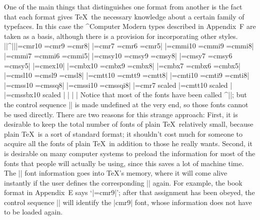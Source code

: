 {{One of the main things that distinguishes one format from another
is the fact that each format gives \TeX\ the necessary knowledge about
a certain family of typefaces. In this case the ^{Computer Modern} types
described in Appendix~F are taken as a basis, although there is a provision
for incorporating other styles.
\beginlines
|\font|^|\tenrm||=cmr10        \font\preloaded=cmr9     \font\preloaded=cmr8|
\nobreak
|\font\sevenrm=cmr7       \font\preloaded=cmr6     \font\fiverm=cmr5|
\smallskip
|\font\teni=cmmi10        \font\preloaded=cmmi9    \font\preloaded=cmmi8|
\nobreak
|\font\seveni=cmmi7       \font\preloaded=cmmi6    \font\fivei=cmmi5|
\smallbreak
|\font\tensy=cmsy10       \font\preloaded=cmsy9    \font\preloaded=cmsy8|
\nobreak
|\font\sevensy=cmsy7      \font\preloaded=cmsy6    \font\fivesy=cmsy5|
\nobreak\smallskip
|\font\tenex=cmex10|
\smallbreak
|\font\tenbf=cmbx10       \font\preloaded=cmbx9    \font\preloaded=cmbx8|
\nobreak
|\font\sevenbf=cmbx7      \font\preloaded=cmbx6    \font\fivebf=cmbx5|
\smallskip
|\font\tensl=cmsl10       \font\preloaded=cmsl9    \font\preloaded=cmsl8|
\nobreak
|\font\tentt=cmtt10       \font\preloaded=cmtt9    \font\preloaded=cmtt8|
\nobreak
|\font\tenit=cmti10       \font\preloaded=cmti9    \font\preloaded=cmti8|
\nobreak
|\font\preloaded=cmss10   \font\preloaded=cmssq8|
\nobreak
|\font\preloaded=cmssi10  \font\preloaded=cmssqi8|
\smallskip
|\font\preloaded=cmr7 scaled  %
\nobreak
|\font\preloaded=cmtt10 scaled |
\nobreak
|\font\preloaded=cmssbx10 scaled |
\smallskip
|%
|%
|\let\preloaded=\undefined %
\endlines
Notice that most of the fonts have been called ^|\preloaded|; but the
control sequence |\preloaded| is made undefined at the very end, so those
fonts cannot be used directly. There are two reasons for this strange
approach: First, it is desirable to keep the total number of fonts
of plain \TeX\ relatively small, because plain \TeX\ is a sort of
standard format; it shouldn't cost much for someone to acquire all the
fonts of plain \TeX\ in addition to those he really wants. Second, it
is desirable on many computer systems to preload the information for
most of the fonts that people will actually be using, since this saves
a lot of machine time. The |\preloaded| font
information goes into \TeX's memory, where it will come alive instantly
if the user defines the corresponding |\font| again. For example, the
book format in Appendix~E says `|\font\ninerm=cmr9|'; after that
assignment has been obeyed, the control sequence |\ninerm| will
identify the |cmr9| font, whose information does not have to be loaded again.

}}
